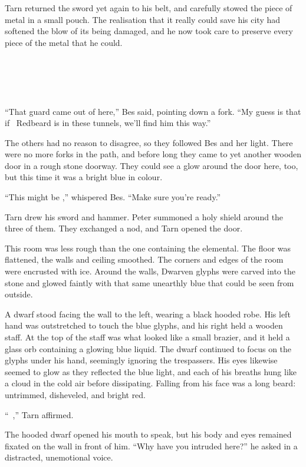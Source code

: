 Tarn returned the sword yet again to his belt, and carefully stowed the piece of metal in a small pouch.  The realisation that it really could save his city had softened the blow of its being damaged, and he now took care to preserve every piece of the metal that he could.

\chapter{\mothzam\ \driktur}

``That guard came out of here,'' Bes said, pointing down a fork.  ``My guess is that if \mothzam\ Redbeard is in these tunnels, we'll find him this way.''

The others had no reason to disagree, so they followed Bes and her light.  There were no more forks in the path, and before long they came to yet another wooden door in a rough stone doorway.  They could see a glow around the door here, too, but this time it was a bright blue in colour.

``This might be \mothzam,'' whispered Bes.  ``Make sure you're ready.''

Tarn drew his sword and hammer.  Peter summoned a holy shield around the three of them.  They exchanged a nod, and Tarn opened the door.

This room was less rough than the one containing the elemental.  The floor was flattened, the walls and ceiling smoothed.  The corners and edges of the room were encrusted with ice.  Around the walls, Dwarven glyphs were carved into the stone and glowed faintly with that same unearthly blue that could be seen from outside.

A dwarf stood facing the wall to the left, wearing a black hooded robe.  His left hand was outstretched to touch the blue glyphs, and his right held a wooden staff.  At the top of the staff was what looked like a small brazier, and it held a glass orb containing a glowing blue liquid.  The dwarf continued to focus on the glyphs under his hand, seemingly ignoring the trespassers.  His eyes likewise seemed to glow as they reflected the blue light, and each of his breaths hung like a cloud in the cold air before dissipating.  Falling from his face was a long beard: untrimmed, disheveled, and bright red.

``\mothzam\ \driktur,'' Tarn affirmed.

The hooded dwarf opened his mouth to speak, but his body and eyes remained fixated on the wall in front of him.
``Why have you intruded here?'' he asked in a distracted, unemotional voice.


